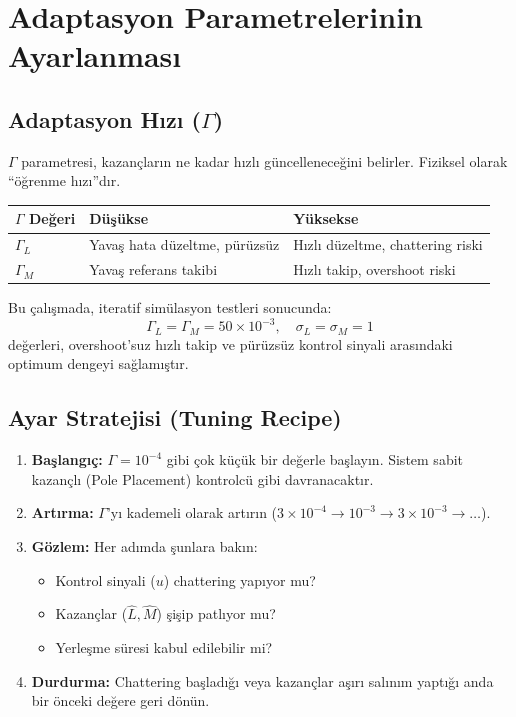 \documentclass[12pt,a4paper]{article}
\begin{document}
\section{Adaptasyon Parametrelerinin Ayarlanması}
\label{sec:tuning}

\subsection{Adaptasyon Hızı ($\Gamma$)}

$\Gamma$ parametresi, kazançların ne kadar hızlı güncelleneceğini belirler. Fiziksel olarak ``öğrenme hızı''dır.

\begin{center}
\begin{tabular}{lp{5cm}p{5cm}}
\toprule
\textbf{$\Gamma$ Değeri} & \textbf{Düşükse} & \textbf{Yüksekse} \\
\midrule
$\Gamma_L$ & Yavaş hata düzeltme, pürüzsüz & Hızlı düzeltme, chattering riski \\
$\Gamma_M$ & Yavaş referans takibi & Hızlı takip, overshoot riski \\
\bottomrule
\end{tabular}
\end{center}

Bu çalışmada, iteratif simülasyon testleri sonucunda:
\begin{equation}
    \Gamma_L = \Gamma_M = 50 \times 10^{-3}, \quad \sigma_L = \sigma_M = 1
\end{equation}
değerleri, overshoot'suz hızlı takip ve pürüzsüz kontrol sinyali arasındaki optimum dengeyi sağlamıştır.

\subsection{Ayar Stratejisi (Tuning Recipe)}

\begin{enumerate}
    \item \textbf{Başlangıç:} $\Gamma = 10^{-4}$ gibi çok küçük bir değerle başlayın. Sistem sabit kazançlı (Pole Placement) kontrolcü gibi davranacaktır.
    \item \textbf{Artırma:} $\Gamma$'yı kademeli olarak artırın ($3 \times 10^{-4} \to 10^{-3} \to 3 \times 10^{-3} \to \ldots$).
    \item \textbf{Gözlem:} Her adımda şunlara bakın:
    \begin{itemize}
        \item Kontrol sinyali ($u$) chattering yapıyor mu?
        \item Kazançlar ($\hat{L}, \hat{M}$) şişip patlıyor mu?
        \item Yerleşme süresi kabul edilebilir mi?
    \end{itemize}
    \item \textbf{Durdurma:} Chattering başladığı veya kazançlar aşırı salınım yaptığı anda bir önceki değere geri dönün.
\end{enumerate}
\end{document}
